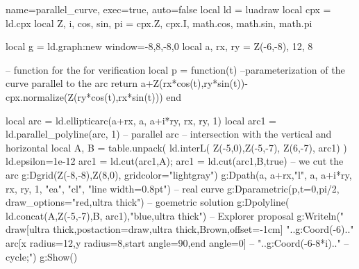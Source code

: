 \documentclass{standalone}%
\begin{document}
\begin{luadraw}{name=parallel_curve, exec=true, auto=false}
local ld = luadraw
local cpx = ld.cpx
local Z, i, cos, sin, pi = cpx.Z, cpx.I, math.cos, math.sin, math.pi

local g = ld.graph:new{ window={-8,8,-8,0} }
local a, rx, ry = Z(-6,-8), 12, 8

-- function for the for verification
local p = function(t) --parameterization of the curve parallel to the arc
    return a+Z(rx*cos(t),ry*sin(t))-cpx.normalize(Z(ry*cos(t),rx*sin(t)))
end

local arc = ld.ellipticarc(a+rx, a, a+i*ry, rx, ry, 1) 
local arc1 = ld.parallel_polyline(arc, 1) -- parallel arc
-- intersection with the vertical and horizontal
local A, B = table.unpack( ld.interL( {Z(-5,0),Z(-5,-7), Z(6,-7)}, arc1) )
ld.epsilon=1e-12
arc1 = ld.cut(arc1,A); arc1 = ld.cut(arc1,B,true) -- we cut the arc
g:Dgrid({Z(-8,-8),Z(8,0)}, {gridcolor="lightgray"})
g:Dpath({a, a+rx,"l", a, a+i*ry, rx, ry, 1, "ea", "cl"}, "line width=0.8pt")
-- real curve 
g:Dparametric(p,{t={0,pi/2}, draw_options="red,ultra thick"})
-- goemetric solution 
g:Dpolyline( ld.concat({A,Z(-5,-7),B}, arc1),"blue,ultra thick")
-- Explorer proposal
g:Writeln("\\draw[ultra thick,postaction={draw,ultra thick,Brown,offset=-1cm}] "..g:Coord(-6).." arc[x radius=12,y radius=8,start angle=90,end angle=0] -- "..g:Coord(-6-8*i).." -- cycle;")
g:Show()
\end{luadraw}
\end{document}
